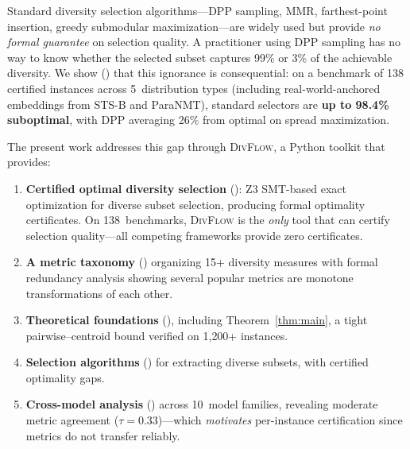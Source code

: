 \documentclass[11pt,a4paper]{article}
\newcommand{\divflow}{\textsc{DivFlow}}
\begin{document}
Standard diversity selection algorithms---DPP sampling, MMR,
farthest-point insertion, greedy submodular maximization---are
widely used but provide \emph{no formal guarantee} on selection
quality.  A practitioner using DPP sampling has no way to know
whether the selected subset captures 99\% or 3\% of the
achievable diversity.  We show () that
this ignorance is consequential: on a benchmark of 138
certified instances across 5~distribution types (including
real-world-anchored embeddings from STS-B and ParaNMT),
standard selectors are \textbf{up to 98.4\% suboptimal},
with DPP averaging 26\% from optimal on spread maximization.

The present work addresses this gap through \divflow{}, a
Python toolkit that provides:

\begin{enumerate}[leftmargin=2em,itemsep=2pt]
\item \textbf{Certified optimal diversity selection}
      (): Z3 SMT-based exact optimization
      for diverse subset selection, producing formal optimality
      certificates.  On 138~benchmarks, \divflow{} is the
      \emph{only} tool that can certify selection quality---all
      competing frameworks provide zero certificates.
\item \textbf{A metric taxonomy} () organizing
      15+ diversity measures with formal redundancy analysis
      showing several popular metrics are monotone transformations
      of each other.
\item \textbf{Theoretical foundations} (),
      including Theorem~\ref{thm:main}, a tight pairwise--centroid
      bound verified on 1{,}200+ instances.
\item \textbf{Selection algorithms} () for
      extracting diverse subsets, with certified optimality gaps.
\item \textbf{Cross-model analysis} () across
      10~model families, revealing moderate metric agreement
      ($\tau = 0.33$)---which \emph{motivates} per-instance
      certification since metrics do not transfer reliably.
\end{enumerate}
\end{document}
